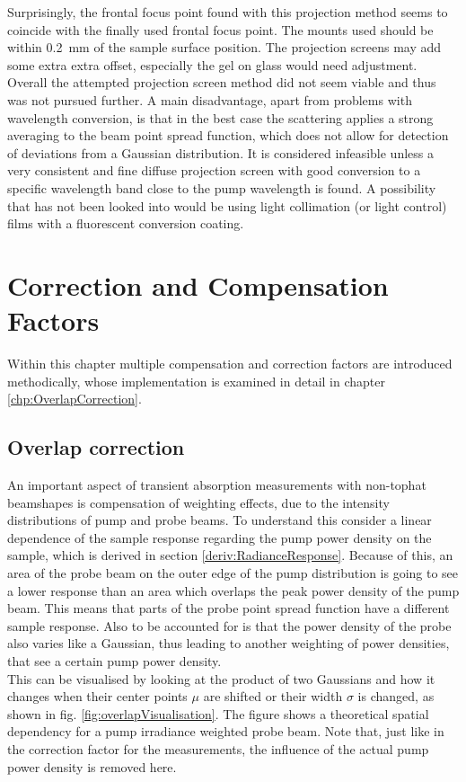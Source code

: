 \documentclass[twoside,openright,listof=numbered]{scrreprt}
\begin{document}
Surprisingly, the frontal focus point found with this projection method seems to coincide with the finally used frontal focus point. The mounts used should be within \qty{0.2}{\milli\meter} of the sample surface position. The projection screens may add some extra extra offset, especially the gel on glass would need adjustment.
Overall the attempted projection screen method did not seem viable and thus was not pursued further. A main disadvantage, apart from problems with wavelength conversion, is that in the best case the scattering applies a strong averaging to the beam point spread function, which does not allow for detection of deviations from a Gaussian distribution. It is considered infeasible unless a very consistent and fine diffuse projection screen with good conversion to a specific wavelength band close to the pump wavelength is found. A possibility that has not been looked into would be using light collimation (or light control) films with a fluorescent conversion coating.



\chapter{Correction and Compensation Factors}\label{chap:CorrandComp}
Within this chapter multiple compensation and correction factors are introduced methodically, whose implementation is examined in detail in chapter \ref{chp:OverlapCorrection}.
\section{Overlap correction}\label{sec:overlapCorrDescription}
An important aspect of transient absorption measurements with non-tophat beamshapes is compensation of weighting effects, due to the intensity distributions of pump and probe beams. To understand this consider a linear dependence of the sample response regarding the pump power density on the sample, which is derived in section \ref{deriv:RadianceResponse}. Because of this, an area of the probe beam on the outer edge of the pump distribution is going to see a lower response than an area which overlaps the peak power density of the pump beam. This means that parts of the probe point spread function have a different sample response. Also to be accounted for is that the power density of the probe also varies like a Gaussian, thus leading to another weighting of power densities, that see a certain pump power density.\\
This can be visualised by looking at the product of two Gaussians and how it changes when their center points $\mu$ are shifted or their width $\sigma$ is changed, as shown in fig. \ref{fig:overlapVisualisation}. The figure shows a theoretical spatial dependency for a pump irradiance weighted probe beam. Note that, just like in the correction factor for the measurements, the influence of the actual pump power density is removed here.
\end{document}
